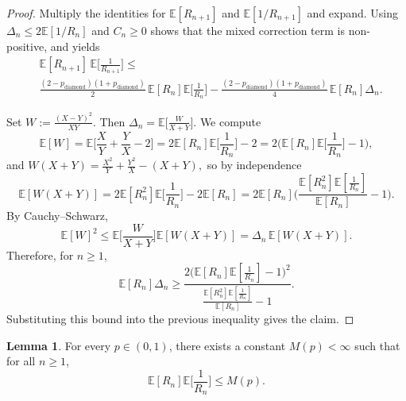 \documentclass{article}
\theoremstyle{plain}
\theoremstyle{definition}
\newtheorem{lemma}[theorem]{Lemma}
\begin{document}
\begin{proof}
Multiply the identities for $\mathbb E[R_{n+1}]$ and $\mathbb E[1/R_{n+1}]$ and expand.
Using $\Delta_n\le 2\mathbb E[1/R_n]$ and $C_n\ge 0$ shows that the mixed correction term is non-positive, and yields
\begin{align*}
&\mathbb E[R_{n+1}]\,\mathbb E\Big[\frac{1}{R_{n+1}}\Big]
\le \\
&\frac{(2-p_{\mathrm{diamond}})(1+p_{\mathrm{diamond}})}{2}\,
\mathbb E[R_n]\mathbb E\Big[\frac{1}{R_n}\Big]
-
\frac{(2-p_{\mathrm{diamond}})(1+p_{\mathrm{diamond}})}{4}\,
\mathbb E[R_n]\Delta_n.
\end{align*}

Set
$
W:=\frac{(X-Y)^2}{XY}.
$
Then $\Delta_n=\mathbb E\big[\frac{W}{X+Y}\big]$.
We compute
\[
\mathbb E[W]
=
\mathbb E\Big[\frac{X}{Y}+\frac{Y}{X}-2\Big]
=
2\mathbb E[R_n]\mathbb E\Big[\frac{1}{R_n}\Big]-2
=
2\Big(\mathbb E[R_n]\mathbb E\Big[\frac{1}{R_n}\Big]-1\Big),
\]
and
$
W(X+Y)=\frac{X^2}{Y}+\frac{Y^2}{X}-(X+Y),
$
so by independence
\[
\mathbb E[W(X+Y)]
=
2\mathbb E[R_n^2]\mathbb E\Big[\frac{1}{R_n}\Big]-2\mathbb E[R_n]
=
2\mathbb E[R_n]\Big(\frac{\mathbb E[R_n^2]\mathbb E[\frac{1}{R_n}]}{\mathbb E[R_n]}-1\Big).
\]
By Cauchy--Schwarz,
\[
\mathbb E[W]^2
\le
\mathbb E\Big[\frac{W}{X+Y}\Big]\mathbb E[W(X+Y)]
=
\Delta_n\,\mathbb E[W(X+Y)].
\]
Therefore, for $n\ge 1$,
\[
\mathbb E[R_n]\Delta_n
\ge
\frac{2\big(\mathbb E[R_n]\mathbb E[\frac{1}{R_n}]-1\big)^2}
{\frac{\mathbb E[R_n^2]\mathbb E[\frac{1}{R_n}]}{\mathbb E[R_n]}-1}.
\]
Substituting this bound into the previous inequality gives the claim.
\end{proof}




\begin{lemma}\label{lem:uniform_product}
For every $p\in(0,1)$, there exists a constant $M(p)<\infty$ such that for all $n\ge 1$,
\[
\mathbb E[R_n]\mathbb E\Big[\frac{1}{R_n}\Big]\le M(p).
\]
\end{lemma}
\end{document}
